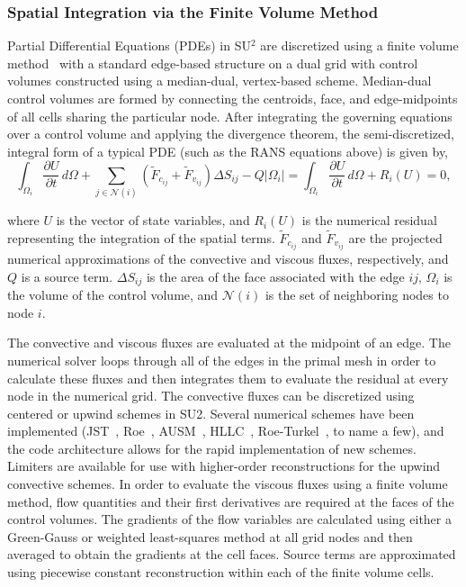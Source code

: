 \subsubsection*{Spatial Integration via the Finite Volume Method}

Partial Differential Equations (PDEs) in SU$^2$ are discretized using a finite volume method~\cite{barth95, hirsch1984,quarteroni97, jameson01, leveque02, wesseling00, jameson:1995a, jameson:1995b, toro1999} with a standard edge-based structure on a dual grid with control volumes constructed using a median-dual, vertex-based scheme. Median-dual control volumes are formed by connecting the centroids, face, and edge-midpoints of all cells sharing the particular node. After integrating the governing equations over a control volume and applying the divergence theorem, the semi-discretized, integral form of a typical PDE (such as the RANS equations above) is given by,
\begin{equation} \label{eq:DiscretizedEq}
\int_{\Omega_i}{\frac{\partial{U}}{\partial{t}}}\,d\Omega + \sum_{j \in \mathcal{N}(i)}(\tilde{F}_{c_{ij}}+\tilde{F}_{v_{ij}})\Delta{S}_{ij} -Q|\Omega_i| = \int_{\Omega_i}{\frac{\partial{U}}{\partial{t}}}\,d\Omega + R_i(U) = 0,
\end{equation}
 
where $U$ is the vector of state variables, and $R_i(U)$ is the numerical residual representing the integration of the spatial terms. $\tilde{F}_{c_{ij}}$ and $\tilde{F}_{v_{ij}}$ are the projected numerical approximations of the convective and viscous fluxes, respectively, and $Q$ is a source term. $\Delta{S}_{ij}$ is the area of the face associated with the edge $ij$, $\Omega_i$ is the volume of the control volume, and $\mathcal{N}(i)$ is the set of neighboring nodes to node $i$.

The convective and viscous fluxes are evaluated at the midpoint of an edge. The numerical solver loops through all of the edges in the primal mesh in order to calculate these fluxes and then integrates them to evaluate the residual at every node in the numerical grid. The convective fluxes can be discretized using centered or upwind schemes in SU2. Several numerical schemes have been implemented (JST~\cite{jameson1981}, Roe~\cite{roe1981}, AUSM~\cite{liou93}, HLLC~\cite{toro1999}, Roe-Turkel~\cite{turkel_1}, to name a few), and the code architecture allows for the rapid implementation of new schemes. Limiters are available for use with higher-order reconstructions for the upwind convective schemes. In order to evaluate the viscous fluxes using a finite volume method, flow quantities and their first derivatives are required at the faces of the control volumes. The gradients of the flow variables are calculated using either a Green-Gauss or weighted least-squares method at all grid nodes and then averaged to obtain the gradients at the cell faces. Source terms are approximated using piecewise constant reconstruction within each of the finite volume cells.

